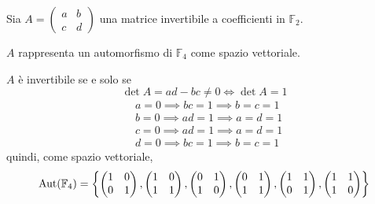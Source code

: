 \documentclass[../main.tex]{subfiles}
\begin{document}
\begin{example}
    Sia $A = \begin{pmatrix}
            a & b \\
            c & d
        \end{pmatrix}$ una matrice invertibile a coefficienti in $\mathbb{F}_2$.

    $A$ rappresenta un automorfismo di $\mathbb{F}_4$ come spazio vettoriale.

    $A$ è invertibile se e solo se
    \begin{equation*}
        \det A = ad - bc \neq 0 \iff \det A = 1
    \end{equation*}
    \begin{align*}
         & a = 0 \implies bc = 1 \implies b = c = 1 \\
         & b = 0 \implies ad = 1 \implies a = d = 1 \\
         & c = 0 \implies ad = 1 \implies a = d = 1 \\
         & d = 0 \implies bc = 1 \implies b = c = 1
    \end{align*}
    quindi, come spazio vettoriale,
    \begin{equation*}
        \operatorname{Aut}(\mathbb{F}_4) = \left\{
        \begin{pmatrix}
            1 & 0 \\
            0 & 1
        \end{pmatrix},
        \begin{pmatrix}
            1 & 0 \\
            1 & 1
        \end{pmatrix},
        \begin{pmatrix}
            0 & 1 \\
            1 & 0
        \end{pmatrix},
        \begin{pmatrix}
            0 & 1 \\
            1 & 1
        \end{pmatrix},
        \begin{pmatrix}
            1 & 1 \\
            0 & 1
        \end{pmatrix},
        \begin{pmatrix}
            1 & 1 \\
            1 & 0
        \end{pmatrix}
        \right\}
    \end{equation*}

\end{example}
\end{document}
